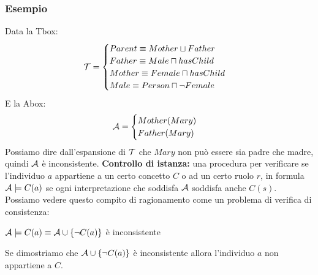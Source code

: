 \documentclass[../main.tex]{subfiles}
\begin{document}
   \subsubsection{Esempio}
   Data la Tbox:
   \begin{equation*}
      \mathcal{T}=
      \begin{cases}
         Parent \equiv Mother \sqcup Father\\
         Father \equiv Male \sqcap hasChild\\
         Mother \equiv Female \sqcap hasChild\\
         Male \equiv Person \sqcap \lnot Female
      \end{cases}
   \end{equation*}
   E la Abox:
   \begin{equation*}
      \mathcal{A}=
      \begin{cases}
         Mother(Mary)\\
         Father(Mary)
      \end{cases}
   \end{equation*}
   Possiamo dire dall'espansione di $\mathcal{T}$ che $Mary$ non può essere sia padre che madre, quindi $\mathcal{A}$ è inconsistente.
   \spazio
   \textbf{Controllo di istanza:} una procedura per verificare se l'individuo $a$ appartiene a un certo concetto $C$ o ad un certo ruolo $r$, in formula $\mathcal{A} \models C(a)$ se ogni interpretazione che soddisfa $\mathcal{A}$ soddisfa anche $C(s)$.\\
   Possiamo vedere questo compito di ragionamento come un problema di verifica di consistenza:
   \begin{center}
      $\mathcal{A} \models C(a) \equiv \mathcal{A} \cup \{\lnot C(a)\}$ è inconsistente
   \end{center}
   Se dimostriamo che $\mathcal{A} \cup \{\lnot C(a)\}$ è inconsistente allora l'individuo $a$ non appartiene a $C$.
\end{document}
